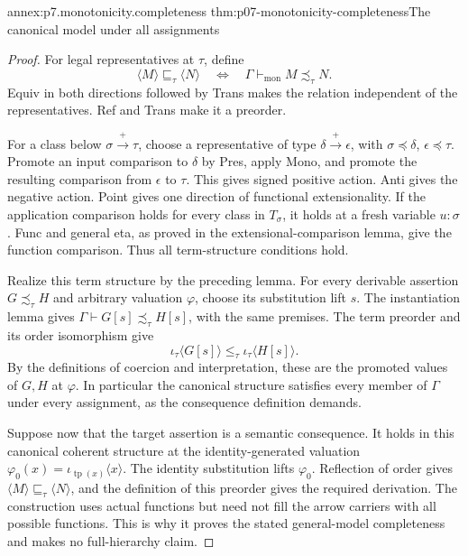 \begin{annexitem}{annex:p7.monotonicity.completeness}
 {thm:p07-monotonicity-completeness}{The canonical model under all assignments}
\begin{proof}
For legal representatives at \(\tau\), define
\[
 \langle M\rangle\sqsubseteq_\tau\langle N\rangle
 \quad\Longleftrightarrow\quad
 \Gamma\vdash_{\mathrm{mon}}M\precsim_\tau N.
\]
Equiv in both directions followed by Trans makes the relation independent
of the representatives. Ref and Trans make it a preorder.

For a class below \(\sigma\xrightarrow+\tau\), choose a representative
of type \(\delta\xrightarrow+\epsilon\), with
\(\sigma\preceq\delta\), \(\epsilon\preceq\tau\).
Promote an input comparison to \(\delta\) by Pres, apply Mono,
and promote the resulting comparison from \(\epsilon\) to \(\tau\).
This gives signed positive action. Anti gives the negative action.
Point gives one direction of functional extensionality.
If the application comparison holds for every class in \(T_\sigma\),
it holds at a fresh variable \(u:\sigma\). Func and general eta,
as proved in the extensional-comparison lemma, give the function
comparison. Thus all term-structure conditions hold.

Realize this term structure by the preceding lemma.
For every derivable assertion \(G\precsim_\tau H\) and arbitrary
valuation \(\varphi\), choose its substitution lift \(s\).
The instantiation lemma gives
\(\Gamma\vdash G[s]\precsim_\tau H[s]\), with the same premises.
The term preorder and its order isomorphism give
\[
 \iota_\tau\langle G[s]\rangle
       \leq_\tau\iota_\tau\langle H[s]\rangle.
\]
By the definitions of coercion and interpretation, these are the promoted
values of \(G,H\) at \(\varphi\).
In particular the canonical structure satisfies every member of
\(\Gamma\) under every assignment, as the consequence definition demands.

Suppose now that the target assertion is a semantic consequence.
It holds in this canonical coherent structure at the identity-generated
valuation
\(\varphi_0(x)=\iota_{\operatorname{tp}(x)}\langle x\rangle\).
The identity substitution lifts \(\varphi_0\).
Reflection of order gives
\(\langle M\rangle\sqsubseteq_\tau\langle N\rangle\), and the
definition of this preorder gives the required derivation.
The construction uses actual functions but need not fill the arrow
carriers with all possible functions. This is why it proves the stated
general-model completeness and makes no full-hierarchy claim.
\end{proof}
\end{annexitem}

